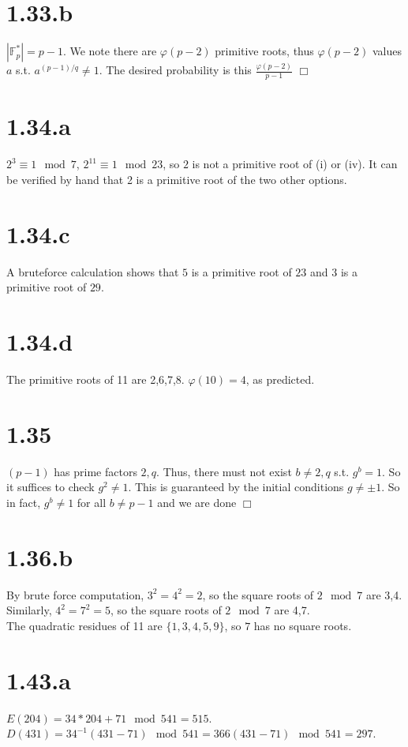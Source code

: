 \documentclass{article}
\begin{document}
\section*{1.33.b}
$|\mathbb{F}_p^*| = p-1$. We note there are $\varphi(p-2)$ primitive roots, thus $\varphi(p-2)$ values $a$ s.t. $a^{(p-1)/q} \neq 1$. The desired probability is this $\frac{\varphi(p-2)}{p-1}$ $\Box$

\section*{1.34.a}
$2^3 \equiv 1 \mod 7$, $2^{11} \equiv 1 \mod 23$, so $2$ is not a primitive root of (i) or (iv). It can be verified by hand that 2 is a primitive root of the two other options.
\section*{1.34.c}
A bruteforce calculation shows that $5$ is a primitive root of $23$ and $3$ is a primitive root of $29$.
\section*{1.34.d}
The primitive roots of 11 are 2,6,7,8. $\varphi(10) = 4$, as predicted.

\section*{1.35}
$(p-1)$ has prime factors $2,q$. Thus, there must not exist $b \neq 2,q$ s.t. $g^b = 1$. So it suffices to check $g^2 \neq 1$. This is guaranteed by the initial conditions $g \neq \pm 1$. So in fact, $g^b \neq 1$ for all $b \neq p-1$ and we are done $\Box$

\section*{1.36.b}
By brute force computation, $3^2 = 4^2 = 2$, so the square roots of $2 \mod 7$ are 3,4.\\
Similarly, $4^2 = 7^2 = 5$, so the square roots of $2 \mod 7$ are 4,7.\\
The quadratic residues of 11 are $\{1,3,4,5,9\}$, so $7$ has no square roots.

\section*{1.43.a}
$E(204) = 34*204 + 71 \mod 541 = 515$. $D(431) = 34^{-1}(431-71) \mod 541 = 366(431-71) \mod 541 = 297$.
\end{document}
